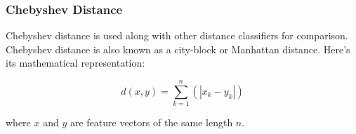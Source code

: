 \subsubsection{Chebyshev Distance}

Chebyshev distance is used along with other distance classifiers
for comparison. Chebyshev distance is also known as
a city-block or Manhattan distance. Here's its mathematical representation:

$$ d(x,y) = \displaystyle\sum_{k=1}^{n}(|x_{k}-y_{k}|) $$

\noindent
where $x$ and $y$ are feature vectors of the same length $n$.
